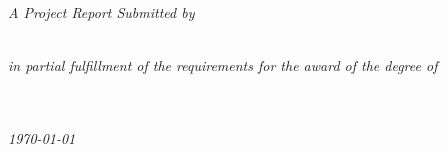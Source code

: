 \begin{titlepage}

  \begin{flushright}
    {\Huge\bfseries\textbf{\ttitle}}\\
  \end{flushright}

  \vfill

  \begin{flushright}
    \large{\emph{A Project Report Submitted by}}\\[0.2cm]
    \huge{\textbf{\authorname}}\\[0.2cm]
    \large{\rn}
  \end{flushright}

  \vfill

  \begin{flushright}
    \large{{\emph{in partial fulfillment of the requirements for the award of the degree of}}}\\[0.2cm]
    \huge{\textbf{\degree}}
  \end{flushright}

  \vfill

  \begin{flushright}

    \Large{\textbf{\univname}}\\[0.2cm]
    \Large{\textbf{\deptname}}\\[0.2cm]
    \Large{\emph{\monthyeardate\today}}
  \end{flushright}

\end{titlepage}